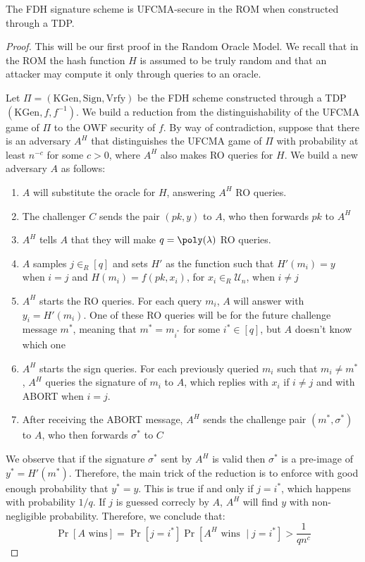 \documentclass[a4paper, 12pt]{report}
\begin{document}
    \begin{framedthm}{}
        The FDH signature scheme is UFCMA-secure in the ROM when constructed through a TDP.
    \end{framedthm}

    \begin{proof}
        This will be our first proof in the Random Oracle Model. We recall that in the ROM the hash function $H$ is assumed to be truly random and that an attacker may compute it only through queries to an oracle.
        
        Let $\Pi = (\mathrm{KGen}, \mathrm{Sign}, \mathrm{Vrfy})$ be the FDH scheme constructed through a TDP $(\mathrm{KGen}, f, f^{-1})$. We build a reduction from the distinguishability of the UFCMA game of $\Pi$ to the OWF security of $f$. By way of contradiction, suppose that there is an adversary $A^H$ that distinguishes the UFCMA game of $\Pi$ with probability at least $n^{-c}$ for some $c > 0$, where $A^H$ also makes RO queries for $H$. We build a new adversary $A$ as follows:
        \begin{enumerate}
            \item $A$ will substitute the oracle for $H$, answering $A^H$ RO queries.
            \item The challenger $C$ sends the pair $(pk, y)$ to $A$, who then forwards $pk$ to $A^H$
            \item $A^H$ tells $A$ that they will make $q = \poly(\lambda)$ RO queries. 
            \item $A$ samples $j \in_R [q]$ and sets $H'$ as the function such that $H'(m_i) = y$ when $i = j$ and $H(m_i) = f(pk, x_i)$, for $x_i \in_R \mathcal{U}_n$, when $i \neq j$
            \item $A^H$ starts the RO queries. For each query $m_i$, $A$ will answer with $y_i = H'(m_i)$. One of these RO queries will be for the future challenge message $m^*$, meaning that $m^* = m_{i^*}$ for some $i^* \in [q]$, but $A$ doesn't know which one 
            \item $A^H$ starts the sign queries. For each previously queried $m_i$ such that $m_i \neq m^*$, $A^H$ queries the signature of $m_i$ to $A$, which replies with $x_i$ if $i \neq j$ and with ABORT when $i = j$.
            \item After receiving the ABORT message, $A^H$ sends the challenge pair $(m^*, \sigma^*)$ to $A$, who then forwards $\sigma^*$ to $C$
        \end{enumerate}

        We observe that if the signature $\sigma^*$ sent by $A^H$ is valid then $\sigma^*$ is a pre-image of $y^* = H'(m^*)$. Therefore, the main trick of the reduction is to enforce with good enough probability that $y^* = y$. This is true if and only if $j = i^*$, which happens with probability $1/q$. If $j$ is guessed correcly by $A$, $A^H$ will find $y$ with non-negligible probability. Therefore, we conclude that:
        \[\Pr[A \text{ wins}] = \Pr[j = i^*] \Pr[A^H \text{ wins } \mid j = i^*] > \frac{1}{q n^c}\]
    \end{proof}
\end{document}
